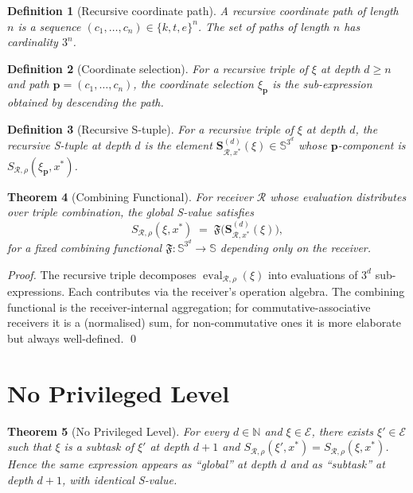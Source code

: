 \documentclass[twocolumn,a4paper]{article}
\newtheorem{theorem}{Theorem}[section]
\newtheorem{definition}[theorem]{Definition}
\DeclareMathOperator{\eval}{eval}
\newcommand{\Sscale}{\mathbb{S}}
\newcommand{\Natural}{\mathbb{N}}
\newcommand{\Expr}{\mathcal{E}}
\newcommand{\receiver}{\mathcal{R}}
\newcommand{\Sscalar}{S}
\newcommand{\Stuple}{\mathbf{S}}
\begin{document}
\begin{definition}[Recursive coordinate path]
\label{def:rec-coord-path}
A \emph{recursive coordinate path} of length $n$ is a sequence $(c_{1},\ldots,c_{n})\in\{k,t,e\}^{n}$. The set of paths of length $n$ has cardinality $3^{n}$.
\end{definition}

\begin{definition}[Coordinate selection]
\label{def:coord-sel}
For a recursive triple of $\xi$ at depth $d\geq n$ and path $\bm{p}=(c_{1},\ldots,c_{n})$, the \emph{coordinate selection} $\xi_{\bm{p}}$ is the sub-expression obtained by descending the path.
\end{definition}

\begin{definition}[Recursive S-tuple]
\label{def:rec-s-tuple}
For a recursive triple of $\xi$ at depth $d$, the \emph{recursive S-tuple at depth $d$} is the element $\Stuple^{(d)}_{\receiver,x^{*}}(\xi)\in\Sscale^{3^{d}}$ whose $\bm{p}$-component is $\Sscalar_{\receiver,\rho}(\xi_{\bm{p}},x^{*})$.
\end{definition}

\begin{theorem}[Combining Functional]
\label{thm:combining-functional}
For receiver $\receiver$ whose evaluation distributes over triple combination, the global S-value satisfies
\[
\Sscalar_{\receiver,\rho}(\xi,x^{*})\;=\;\mathfrak{F}\bigl(\Stuple^{(d)}_{\receiver,x^{*}}(\xi)\bigr),
\]
for a fixed combining functional $\mathfrak{F}\colon\Sscale^{3^{d}}\to\Sscale$ depending only on the receiver.
\end{theorem}

\begin{proof}
The recursive triple decomposes $\eval_{\receiver,\rho}(\xi)$ into evaluations of $3^{d}$ sub-expressions. Each contributes via the receiver's operation algebra. The combining functional is the receiver-internal aggregation; for commutative-associative receivers it is a (normalised) sum, for non-commutative ones it is more elaborate but always well-defined. \qed
\end{proof}

\section{No Privileged Level}
\label{sec:no-priv-level}

\begin{theorem}[No Privileged Level]
\label{thm:no-priv-level}
For every $d\in\Natural$ and $\xi\in\Expr$, there exists $\xi'\in\Expr$ such that $\xi$ is a subtask of $\xi'$ at depth $d+1$ and $\Sscalar_{\receiver,\rho}(\xi',x^{*})=\Sscalar_{\receiver,\rho}(\xi,x^{*})$. Hence the same expression appears as ``global'' at depth $d$ and as ``subtask'' at depth $d+1$, with identical S-value.
\end{theorem}
\end{document}
